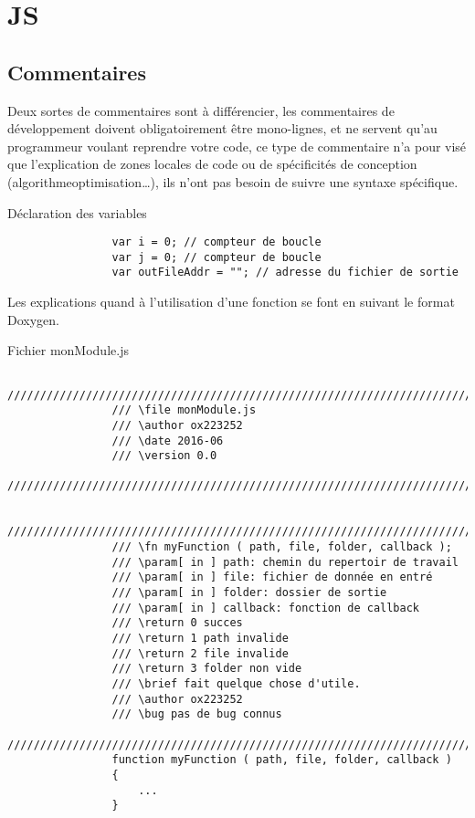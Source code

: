 
\chapter{JS}
	\section{Commentaires}
		Deux sortes de commentaires sont à différencier, les commentaires de développement doivent obligatoirement être mono-lignes, et ne servent qu'au programmeur voulant reprendre votre code, ce type de commentaire n'a pour visé que l'explication de zones locales de code ou de spécificités de conception (algorithme\/optimisation\/\dots), ils n'ont pas besoin de suivre une syntaxe spécifique. 

		\begin{cbox}{Déclaration des variables}
			\begin{verbatim}
				var i = 0; // compteur de boucle
				var j = 0; // compteur de boucle
				var outFileAddr = ""; // adresse du fichier de sortie
			\end{verbatim}
		\end{cbox}

		Les explications quand à l'utilisation d'une fonction se font en suivant le format Doxygen.

		\begin{cbox}{Fichier monModule.js}
			\begin{verbatim}
				////////////////////////////////////////////////////////////////////////////////
				/// \file monModule.js
				/// \author ox223252
				/// \date 2016-06
				/// \version 0.0
				////////////////////////////////////////////////////////////////////////////////

				////////////////////////////////////////////////////////////////////////////////
				/// \fn myFunction ( path, file, folder, callback );
				/// \param[ in ] path: chemin du repertoir de travail
				/// \param[ in ] file: fichier de donnée en entré
				/// \param[ in ] folder: dossier de sortie
				/// \param[ in ] callback: fonction de callback
				/// \return 0 succes
				/// \return 1 path invalide
				/// \return 2 file invalide
				/// \return 3 folder non vide
				/// \brief fait quelque chose d'utile.
				/// \author ox223252
				/// \bug pas de bug connus
				////////////////////////////////////////////////////////////////////////////////
				function myFunction ( path, file, folder, callback )
				{
				    ...
				}
			\end{verbatim}
		\end{cbox}
	
